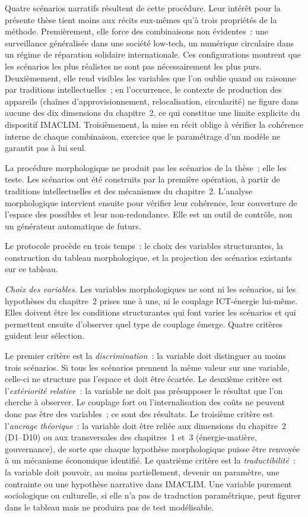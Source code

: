Quatre scénarios narratifs résultent de cette procédure. Leur intérêt pour la présente thèse tient moins aux récits eux-mêmes qu'à trois propriétés de la méthode. Premièrement, elle force des combinaisons non évidentes~: une surveillance généralisée dans une société low-tech, un numérique circulaire dans un régime de réparation solidaire internationale. Ces configurations montrent que les scénarios les plus réalistes ne sont pas nécessairement les plus purs. Deuxièmement, elle rend visibles les variables que l'on oublie quand on raisonne par traditions intellectuelles~; en l'occurrence, le contexte de production des appareils (chaînes d'approvisionnement, relocalisation, circularité) ne figure dans aucune des dix dimensions du chapitre~2, ce qui constitue une limite explicite du dispositif IMACLIM. Troisièmement, la mise en récit oblige à vérifier la cohérence interne de chaque combinaison, exercice que le paramétrage d'un modèle ne garantit pas à lui seul.

La procédure morphologique ne produit pas les scénarios de la thèse~; elle les teste. Les scénarios ont été construits par la première opération, \`a partir de traditions intellectuelles et des mécanismes du chapitre~2. L'analyse morphologique intervient ensuite pour vérifier leur cohérence, leur couverture de l'espace des possibles et leur non-redondance. Elle est un outil de contr\^ole, non un générateur automatique de futurs.

Le protocole proc\`ede en trois temps~: le choix des variables structurantes, la construction du tableau morphologique, et la projection des scénarios existants sur ce tableau.

\emph{Choix des variables.} Les variables morphologiques ne sont ni les scénarios, ni les hypoth\`eses du chapitre~2 prises une \`a une, ni le couplage ICT-\'energie lui-m\^eme. Elles doivent \^etre les conditions structurantes qui font varier les scénarios et qui permettent ensuite d'observer quel type de couplage \'emerge. Quatre crit\`eres guident leur s\'election.

Le premier crit\`ere est la \emph{discrimination}~: la variable doit distinguer au moins trois sc\'enarios. Si tous les sc\'enarios prennent la m\^eme valeur sur une variable, celle-ci ne structure pas l'espace et doit \^etre \'ecart\'ee. Le deuxi\`eme crit\`ere est l'\emph{ext\'eriorit\'e relative}~: la variable ne doit pas pr\'esupposer le r\'esultat que l'on cherche \`a observer. Le \og couplage fort\fg{} ou l'\og internalisation des co\^uts\fg{} ne peuvent donc pas \^etre des variables~; ce sont des r\'esultats. Le troisi\`eme crit\`ere est l'\emph{ancrage th\'eorique}~: la variable doit \^etre reli\'ee aux dimensions du chapitre~2 (D1--D10) ou aux transversales des chapitres~1 et~3 (\'energie-mati\`ere, gouvernance), de sorte que chaque hypoth\`ese morphologique puisse \^etre renvoy\'ee \`a un m\'ecanisme \'economique identifi\'e. Le quatri\`eme crit\`ere est la \emph{traductibilit\'e}~: la variable doit pouvoir, au moins partiellement, devenir un param\`etre, une contrainte ou une hypoth\`ese narrative dans IMACLIM. Une variable purement sociologique ou culturelle, si elle n'a pas de traduction param\'etrique, peut figurer dans le tableau mais ne produira pas de test mod\'elisable.


